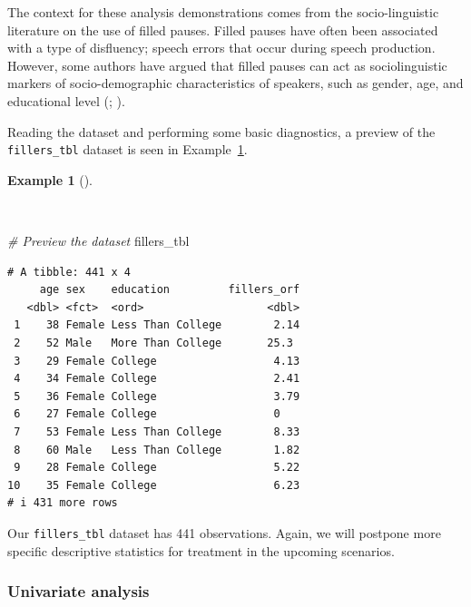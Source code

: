 \documentclass[
  letterpaper,
  krantz1]{latex/krantz-mod}
\newenvironment{Shaded}{\begin{snugshade}}{\end{snugshade}}
\newcommand{\CommentTok}[1]{\textcolor[rgb]{0.00,0.00,0.00}{\textit{#1}}}
\newcommand{\NormalTok}[1]{\textcolor[rgb]{0.00,0.00,0.00}{#1}}
\theoremstyle{definition}
\theoremstyle{definition}
\newtheorem{example}{Example}[chapter]
\theoremstyle{remark}
\begin{document}
The context for these analysis demonstrations comes from the
socio-linguistic literature on the use of filled
pauses. Filled pauses have often been associated
with a type of disfluency; speech errors that occur during speech
production. However, some authors have argued that filled pauses can act
as sociolinguistic markers of socio-demographic characteristics of
speakers, such as gender, age, and educational level
(;
).

Reading the dataset and performing some basic diagnostics, a preview of
the \texttt{fillers\_tbl} dataset is seen in
Example~\ref{exm-infer-num-dataset}.

\pagebreak

\begin{example}[]\protect\hypertarget{exm-infer-num-dataset}{}\label{exm-infer-num-dataset}

~

\begin{Shaded}
\begin{Highlighting}[numbers=left,,]
\CommentTok{\# Preview the dataset}
\NormalTok{fillers\_tbl}
\end{Highlighting}
\end{Shaded}

\begin{verbatim}
# A tibble: 441 x 4
     age sex    education         fillers_orf
   <dbl> <fct>  <ord>                   <dbl>
 1    38 Female Less Than College        2.14
 2    52 Male   More Than College       25.3 
 3    29 Female College                  4.13
 4    34 Female College                  2.41
 5    36 Female College                  3.79
 6    27 Female College                  0   
 7    53 Female Less Than College        8.33
 8    60 Male   Less Than College        1.82
 9    28 Female College                  5.22
10    35 Female College                  6.23
# i 431 more rows
\end{verbatim}

\end{example}

Our \texttt{fillers\_tbl} dataset has 441 observations. Again, we will
postpone more specific descriptive statistics for treatment in the
upcoming scenarios.

\subsubsection{Univariate analysis}\label{univariate-analysis}
\end{document}

